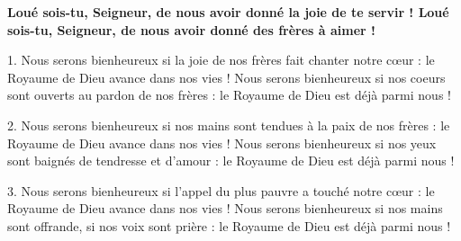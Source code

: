 \textbf{
Loué sois-tu, Seigneur,
de nous avoir donné la joie de te servir !
Loué sois-tu, Seigneur,
de nous avoir donné des frères à aimer !
}

1.
Nous serons bienheureux
si la joie de nos frères fait chanter notre cœur :
le Royaume de Dieu avance dans nos vies !
Nous serons bienheureux
si nos coeurs sont ouverts au pardon de nos frères :
le Royaume de Dieu est déjà parmi nous !

2.
Nous serons bienheureux
si nos mains sont tendues à la paix de nos frères :
le Royaume de Dieu avance dans nos vies !
Nous serons bienheureux
si nos yeux sont baignés de tendresse et d'amour :
le Royaume de Dieu est déjà parmi nous !

3.
Nous serons bienheureux
si l'appel du plus pauvre a touché notre cœur :
le Royaume de Dieu avance dans nos vies !
Nous serons bienheureux
si nos mains sont offrande, si nos voix sont prière :
le Royaume de Dieu est déjà parmi nous ! 
